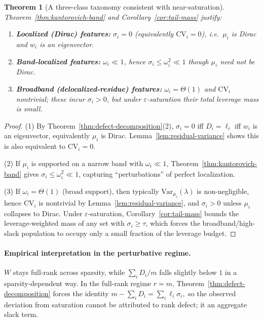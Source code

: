 \documentclass{article}
\theoremstyle{plain}
\newtheorem{theorem}{Theorem}
\numberwithin{equation}{section}
\theoremstyle{definition}
\theoremstyle{remark}
\begin{document}
\begin{lemmaproofbox}
\begin{theorem}[A three-class taxonomy consistent with near-saturation]\label{cor:taxonomy}
Theorem~\ref{thm:kantorovich-band} and Corollary~\ref{cor:tail-mass} justify:
\begin{enumerate}
\item \textbf{Localized (Dirac) features:} $\sigma_i=0$ (equivalently $\mathrm{CV}_i=0$), i.e.\ $\mu_i$ is Dirac and $w_i$ is an eigenvector.
\item \textbf{Band-localized features:} $\omega_i\ll 1$, hence $\sigma_i\le\omega_i^2\ll 1$ though $\mu_i$ need not be Dirac.
\item \textbf{Broadband (delocalized-residue) features:} $\omega_i=\Theta(1)$ and $\mathrm{CV}_i$ nontrivial; these incur $\sigma_i>0$,
but under $\varepsilon$-saturation their total leverage mass is small.
\end{enumerate}
\end{theorem}

\begin{proof}
(1) By Theorem~\ref{thm:defect-decomposition}(2), $\sigma_i=0$ iff $D_i=\ell_i$ iff $w_i$ is an eigenvector,
equivalently $\mu_i$ is Dirac. Lemma~\ref{lem:residual-variance} shows this is also equivalent to $\mathrm{CV}_i=0$.

(2) If $\mu_i$ is supported on a narrow band with $\omega_i\ll 1$, Theorem~\ref{thm:kantorovich-band} gives
$\sigma_i\le \omega_i^2\ll 1$, capturing “perturbations” of perfect localization.

(3) If $\omega_i=\Theta(1)$ (broad support), then typically $\mathrm{Var}_{\mu_i}(\lambda)$ is non-negligible, hence
$\mathrm{CV}_i$ is nontrivial by Lemma~\ref{lem:residual-variance}, and $\sigma_i>0$ unless $\mu_i$ collapses to Dirac.
Under $\varepsilon$-saturation, Corollary~\ref{cor:tail-mass} bounds the leverage-weighted mass of any set with
$\sigma_i\ge \tau$, which forces the broadband/high-slack population to occupy only a small fraction of the leverage budget.
\end{proof}
\end{lemmaproofbox}

\paragraph{Empirical interpretation in the perturbative regime.}
$W$ stays full-rank across sparsity, while $\sum_i D_i/m$ falls slightly below $1$ in a sparsity-dependent way. In the full-rank regime $r=m$, Theorem~\ref{thm:defect-decomposition} forces the identity \(m-\sum_i D_i=\sum_i \ell_i\sigma_i,\) so the observed deviation from saturation cannot be attributed to rank defect; it an aggregate slack term.
\end{document}
